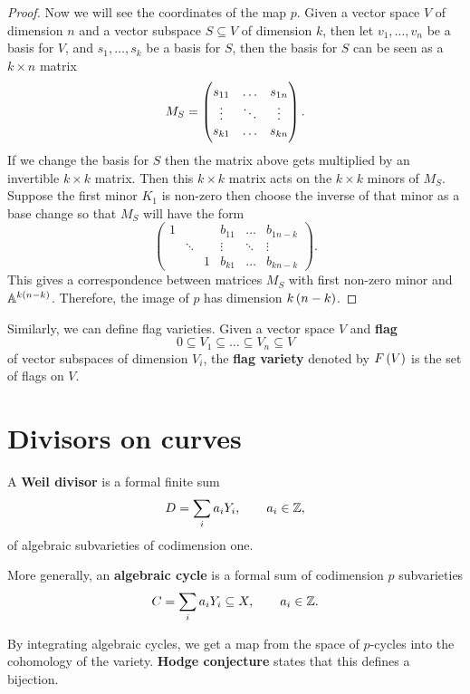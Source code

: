\begin{proof}
Now we will see the coordinates of the map $ p $. Given a vector space $ V $ of dimension $ n $ and a vector subspace $ S \subseteq V $ of dimension $ k $, then let $ v_1, \dots, v_n $ be a basis for $ V $, and $ s_1, \dots, s_k $ be a basis for $ S $, then the basis for $ S $ can be seen as a $ k \times n $ matrix
$$ M_S = \threebythree{s_{11}}{\dots}{s_{1n}}{\vdots}{\ddots}{\vdots}{s_{k1}}{\dots}{s_{kn}}. $$
If we change the basis for $ S $ then the matrix above gets multiplied by an invertible $ k \times k $ matrix. Then this $ k \times k $ matrix acts on the $ k \times k $ minors of $ M_S $. Suppose the first minor $ K_1 $ is non-zero then choose the inverse of that minor as a base change so that $ M_S $ will have the form
$$
\begin{pmatrix}
1 & & & b_{11} & \dots & b_{1n - k} \\
& \ddots & & \vdots & \ddots & \vdots \\
& & 1 & b_{k1} & \dots & b_{kn - k}
\end{pmatrix}.
$$
This gives a correspondence between matrices $ M_S $ with first non-zero minor and $ \A^{k\br{n - k}} $. Therefore, the image of $ p $ has dimension $ k\br{n - k} $.
\end{proof}

Similarly, we can define flag varieties. Given a vector space $ V $ and \textbf{flag}
$$ 0 \subseteq V_1 \subseteq \dots \subseteq V_n \subseteq V $$
of vector subspaces of dimension $ V_i $, the \textbf{flag variety} denoted by $ F\br{V} $ is the set of flags on $ V $.

\pagebreak

\section{Divisors on curves}

\begin{definition}
A \textbf{Weil divisor} is a formal finite sum
$$ D = \sum_i a_iY_i, \qquad a_i \in \mathbb{Z}, $$
of algebraic subvarieties of codimension one.
\end{definition}

\begin{definition}
More generally, an \textbf{algebraic cycle} is a formal sum of codimension $ p $ subvarieties
$$ C = \sum_i a_iY_i \subseteq X, \qquad a_i \in \mathbb{Z}. $$
\end{definition}

By integrating algebraic cycles, we get a map from the space of $ p $-cycles into the cohomology of the variety. \textbf{Hodge conjecture} states that this defines a bijection.

